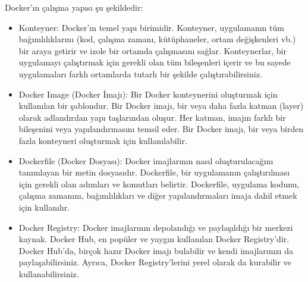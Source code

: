 Docker'ın çalışma yapısı şu şekildedir:
\begin{itemize}
\item Konteyner: Docker'ın temel yapı birimidir. Konteyner, uygulamanın tüm bağımlılıklarını (kod, çalışma zamanı, kütüphaneler, ortam değişkenleri vb.) bir araya getirir ve izole bir ortamda çalışmasını sağlar. Konteynerlar, bir uygulamayı çalıştırmak için gerekli olan tüm bileşenleri içerir ve bu sayede uygulamaları farklı ortamlarda tutarlı bir şekilde çalıştırabilirsiniz.

\item Docker Image (Docker İmajı): Bir Docker konteynerini oluşturmak için kullanılan bir şablondur. Bir Docker imajı, bir veya daha fazla katman (layer) olarak adlandırılan yapı taşlarından oluşur. Her katman, imajın farklı bir bileşenini veya yapılandırmasını temsil eder. Bir Docker imajı, bir veya birden fazla konteyneri oluşturmak için kullanılabilir.

\item Dockerfile (Docker Dosyası): Docker imajlarının nasıl oluşturulacağını tanımlayan bir metin dosyasıdır. Dockerfile, bir uygulamanın çalıştırılması için gerekli olan adımları ve komutları belirtir. Dockerfile, uygulama kodunu, çalışma zamanını, bağımlılıkları ve diğer yapılandırmaları imaja dahil etmek için kullanılır.

\item Docker Registry: Docker imajlarının depolandığı ve paylaşıldığı bir merkezi kaynak. Docker Hub, en popüler ve yaygın kullanılan Docker Registry'dir. Docker Hub'da, birçok hazır Docker imajı bulabilir ve kendi imajlarınızı da paylaşabilirsiniz. Ayrıca, Docker Registry'lerini yerel olarak da kurabilir ve kullanabilirsiniz.
\end{itemize}


